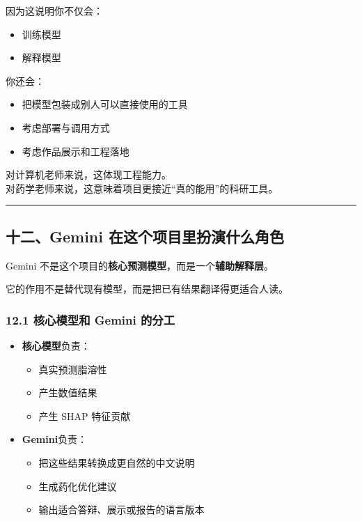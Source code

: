 \documentclass[
  ,
]{ctexart}
\providecommand{\tightlist}{%
  \setlength{\itemsep}{0pt}\setlength{\parskip}{0pt}}
\begin{document}
因为这说明你不仅会：

\begin{itemize}
\tightlist
\item
  训练模型
\item
  解释模型
\end{itemize}

你还会：

\begin{itemize}
\tightlist
\item
  把模型包装成别人可以直接使用的工具
\item
  考虑部署与调用方式
\item
  考虑作品展示和工程落地
\end{itemize}

对计算机老师来说，这体现工程能力。\\
对药学老师来说，这意味着项目更接近``真的能用''的科研工具。

\begin{center}\rule{0.5\linewidth}{0.5pt}\end{center}

\hypertarget{ux5341ux4e8cgemini-ux5728ux8fd9ux4e2aux9879ux76eeux91ccux626eux6f14ux4ec0ux4e48ux89d2ux8272}{%
\subsection{十二、Gemini
在这个项目里扮演什么角色}\label{ux5341ux4e8cgemini-ux5728ux8fd9ux4e2aux9879ux76eeux91ccux626eux6f14ux4ec0ux4e48ux89d2ux8272}}

Gemini
不是这个项目的\textbf{核心预测模型}，而是一个\textbf{辅助解释层}。

它的作用不是替代现有模型，而是把已有结果翻译得更适合人读。

\hypertarget{ux6838ux5fc3ux6a21ux578bux548c-gemini-ux7684ux5206ux5de5}{%
\subsubsection{12.1 核心模型和 Gemini
的分工}\label{ux6838ux5fc3ux6a21ux578bux548c-gemini-ux7684ux5206ux5de5}}

\begin{itemize}
\tightlist
\item
  \textbf{核心模型}负责：

  \begin{itemize}
  \tightlist
  \item
    真实预测脂溶性
  \item
    产生数值结果
  \item
    产生 SHAP 特征贡献
  \end{itemize}
\item
  \textbf{Gemini}负责：

  \begin{itemize}
  \tightlist
  \item
    把这些结果转换成更自然的中文说明
  \item
    生成药化优化建议
  \item
    输出适合答辩、展示或报告的语言版本
  \end{itemize}
\end{itemize}
\end{document}
